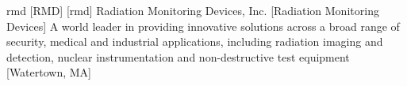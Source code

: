\newglsXcompany%
{rmd}%
[RMD]
[rmd]
{Radiation Monitoring Devices, Inc.}%
[Radiation Monitoring Devices]%
{A world leader in providing innovative solutions across a broad range of security, medical and industrial applications, including radiation imaging and detection, nuclear instrumentation and non-destructive test equipment \cite{website:Radiation_Monitoring_Devices}}%
[Watertown, MA]%